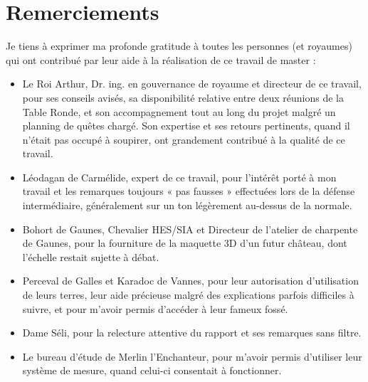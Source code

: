 \section*{Remerciements}
Je tiens à exprimer ma profonde gratitude à toutes les personnes (et royaumes) qui ont contribué par leur aide à la réalisation de ce travail de master :
\begin{itemize}[itemsep=1em]
    \item Le Roi Arthur, Dr. ing. en gouvernance de royaume et directeur de ce travail, pour ses conseils avisés, sa disponibilité relative entre deux réunions de la Table Ronde, et son accompagnement tout au long du projet malgré un planning de quêtes chargé. Son expertise et ses retours pertinents, quand il n'était pas occupé à soupirer, ont grandement contribué à la qualité de ce travail.
    \item Léodagan de Carmélide, expert de ce travail, pour l'intérêt porté à mon travail et les remarques toujours « pas fausses » effectuées lors de la défense intermédiaire, généralement sur un ton légèrement au-dessus de la normale.
    \item Bohort de Gaunes, Chevalier HES/SIA et Directeur de l'atelier de charpente de Gaunes, pour la fourniture de la maquette 3D d'un futur château, dont l'échelle restait sujette à débat.
    \item Perceval de Galles et Karadoc de Vannes, pour leur autorisation d'utilisation de leurs terres, leur aide précieuse malgré des explications parfois difficiles à suivre, et pour m'avoir permis d'accéder à leur fameux fossé.
    \item Dame Séli, pour la relecture attentive du rapport et ses remarques sans filtre.
    \item Le bureau d'étude de Merlin l'Enchanteur, pour m'avoir permis d'utiliser leur système de mesure, quand celui-ci consentait à fonctionner.
\end{itemize}

\newpage
